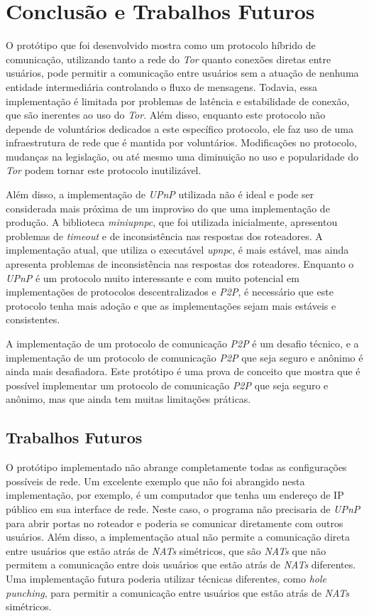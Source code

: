 \chapter{Conclusão e Trabalhos Futuros}

O protótipo que foi desenvolvido mostra como um protocolo híbrido de comunicação, utilizando tanto a rede do \textit{Tor} quanto conexões diretas entre usuários, pode permitir a comunicação entre usuários sem a atuação de nenhuma entidade intermediária controlando o fluxo de mensagens. Todavia, essa implementação é limitada por problemas de latência e estabilidade de conexão, que são inerentes ao uso do \textit{Tor}. Além disso, enquanto este protocolo não depende de voluntários dedicados a este específico protocolo, ele faz uso de uma infraestrutura de rede que é mantida por voluntários. Modificações no protocolo, mudanças na legislação, ou até mesmo uma diminuição no uso e popularidade do \textit{Tor} podem tornar este protocolo inutilizável.

Além disso, a implementação de \textit{UPnP} utilizada não é ideal e pode ser considerada mais próxima de um improviso do que uma implementação de produção. A biblioteca \textit{miniupnpc}, que foi utilizada inicialmente, apresentou problemas de \textit{timeout} e de inconsistência nas respostas dos roteadores. A implementação atual, que utiliza o executável \textit{upnpc}, é mais estável, mas ainda apresenta problemas de inconsistência nas respostas dos roteadores. Enquanto o \textit{UPnP} é um protocolo muito interessante e com muito potencial em implementações de protocolos descentralizados e \textit{P2P}, é necessário que este protocolo tenha mais adoção e que as implementações sejam mais estáveis e consistentes.

A implementação de um protocolo de comunicação \textit{P2P} é um desafio técnico, e a implementação de um protocolo de comunicação \textit{P2P} que seja seguro e anônimo é ainda mais desafiadora. Este protótipo é uma prova de conceito que mostra que é possível implementar um protocolo de comunicação \textit{P2P} que seja seguro e anônimo, mas que ainda tem muitas limitações práticas.

\section{Trabalhos Futuros}

O protótipo implementado não abrange completamente todas as configurações possíveis de rede. Um excelente exemplo que não foi abrangido nesta implementação, por exemplo, é um computador que tenha um endereço de IP público em sua interface de rede. Neste caso, o programa não precisaria de \textit{UPnP} para abrir portas no roteador e poderia se comunicar diretamente com outros usuários. Além disso, a implementação atual não permite a comunicação direta entre usuários que estão atrás de \textit{NATs} simétricos, que são \textit{NATs} que não permitem a comunicação entre dois usuários que estão atrás de \textit{NATs} diferentes. Uma implementação futura poderia utilizar técnicas diferentes, como \textit{hole punching}, para permitir a comunicação entre usuários que estão atrás de \textit{NATs} simétricos.

